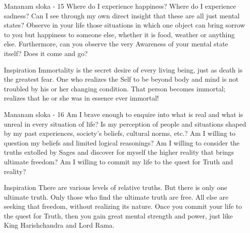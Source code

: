\newpage
\begin{mananam}{\mananamfont Mananam sloka - 15}
\mananamtext Where do I experience happiness? Where do I experience sadness? Can I see through my own direct insight that these are all just mental states? Observe in your life those situations in which one object can bring sorrow to you but happiness to someone else, whether it is food, weather or anything else. Furthermore, can you observe the very Awareness of your mental state itself? Does it come and go? 
\end{mananam}
\WritingHand{}
\begin{inspiration}{\mananamfont Inspiration}
\mananamtext Immortality is the secret desire of every living being, just as death is the greatest fear. One who realizes the Self to be beyond body and mind is not troubled by his or her changing condition. That person becomes immortal; realizes that he or she was in essence ever immortal!
\end{inspiration}
\newpage

\newpage
\begin{mananam}{\mananamfont Mananam sloka - 16}
\mananamtext Am I brave enough to enquire into what is real and what is unreal in every situation of life? Is my perception of people and situations shaped by my past experiences, society’s beliefs, cultural norms, etc.? Am I willing to question my beliefs and limited logical reasonings? Am I willing to consider the truths extolled by Sages and discover for myself the higher reality that brings ultimate freedom? 
Am I willing to commit my life to the quest for Truth and reality?
\end{mananam}
\WritingHand{}
\begin{inspiration}{\mananamfont Inspiration}
\mananamtext There are various levels of relative truths. But there is only one ultimate truth. Only those who find the ultimate truth are free. All else are seeking that freedom, without realizing its nature. Once you commit your life to the quest for Truth, then you gain great mental strength and power, just like King Harishchandra and Lord Rama.
\end{inspiration}
\newpage

